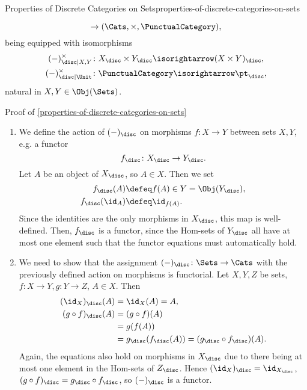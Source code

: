 \begin{proposition}{Properties of Discrete Categories on Sets}{properties-of-discrete-categories-on-sets}
\begin{enumerate}
\[                \to
                (\Cats,\times,\PunctualCategory),
            \]%
            being equipped with isomorphisms%
            \[
                \begin{gathered}
                    (-)^{\times}_{\disc|X,Y}   \colon X_{\disc}\times Y_{\disc} \isorightarrow (X\times Y)_{\disc},\\
                    (-)^{\times}_{\disc|\Unit} \colon \PunctualCategory         \isorightarrow \pt_{\disc},
                \end{gathered}
            \]%
            natural in $X,Y\in\Obj(\Sets)$.%
    \end{enumerate}
\end{proposition}
\begin{Proof}{Proof of \cref{properties-of-discrete-categories-on-sets}}%
    \begin{enumerate}
      \item We define the action of $(-)_\disc$ on morphisms $f \colon X \to Y$ between sets $X,Y$, e.g. a functor
            \[f_\disc \colon X_\disc \to Y_\disc.\]
            Let $A$ be an object of $X_\disc$, so $A \in X$.
            Then we set
            \begin{align*}
              f_\disc(A) &\defeq f(A) \in Y = \Obj(Y_\disc),\\
              f_\disc(\id_A) &\defeq \id_{f(A)}.
            \end{align*}
            Since the identities are the only morphisms in $X_\disc$, this map is well-defined.
            Then, $f_\disc$ is a functor, since the Hom-sets of $Y_\disc$ all have at most one element such that the functor equations must automatically hold.
      \item We need to show that the assignment $(-)_\disc \colon \Sets \to \Cats$ with the previously defined action on morphisms is functorial.
            Let $X,Y,Z$ be sets, $f \colon X \to Y, g \colon Y \to Z$, $A \in X$. Then
            \begin{align*}
            (\id_X)_\disc(A) &= \id_X(A) = A,\\
            (g \circ f)_\disc(A) &= (g\circ f)(A) \\&= g(f(A)) \\&= g_\disc(f_\disc(A)) = (g_\disc \circ f_\disc)(A).
            \end{align*}
            Again, the equations also hold on morphisms in $X_\disc$ due to there being at most one element in the Hom-sets of $Z_\disc$.
            Hence $(\id_X)_\disc = \id_{X_\disc}$, $(g \circ f)_\disc = g_\disc \circ f_\disc$, so $(-)_\disc$ is a functor.
      \end{enumerate}


\end{Proof}
